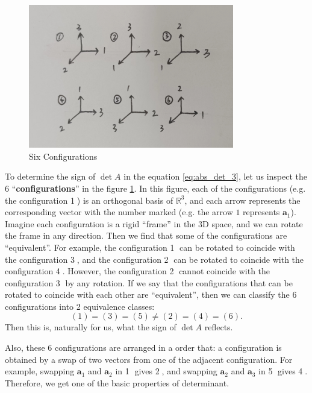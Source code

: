 \documentclass{article}
\begin{document}
\begin{figure}[H]
    \centering
    \includegraphics[width=0.8\textwidth]{figs_I1/3.jpg}
    \caption{Six Configurations}
    \label{fig:6_configs}
\end{figure}

To determine the sign of $\det A$ in the equation \ref{eq:abs_det_3}, let us inspect the 6 ``\textbf{configurations}'' in the figure \ref{fig:6_configs}. In this figure, each of the configurations (e.g. the configuration \textcircled{1}) is an orthogonal basis of $\mathbb{R}^3$, and each arrow represents the corresponding vector with the number marked (e.g. the arrow $1$ represents $\pmb{a}_1$). Imagine each configuration is a rigid ``frame'' in the 3D space, and we can rotate the frame in any direction. Then we find that some of the configurations are ``equivalent''. For example, the configuration \textcircled{1} can be rotated to coincide with the configuration \textcircled{3}, and the configuration \textcircled{2} can be rotated to coincide with the configuration \textcircled{4}. However, the configuration \textcircled{2} cannot coincide with the configuration \textcircled{3} by any rotation. If we say that the configurations that can be rotated to coincide with each other are ``equivalent'', then we can classify the 6 configurations into 2 equivalence classes: 
$$ (1) = (3) = (5) \neq (2) = (4) = (6). $$
Then this is, naturally for us, what the sign of $\det A$ reflects. 

Also, these 6 configurations are arranged in a order that: a configuration is obtained by a swap of two vectors from one of the adjacent configuration. For example, swapping $\pmb{a}_1$ and $\pmb{a}_2$ in \textcircled{1} gives \textcircled{2}, and swapping $\pmb{a}_2$ and $\pmb{a}_3$ in \textcircled{5} gives \textcircled{4}. Therefore, we get one of the basic properties of determinant.
\end{document}

